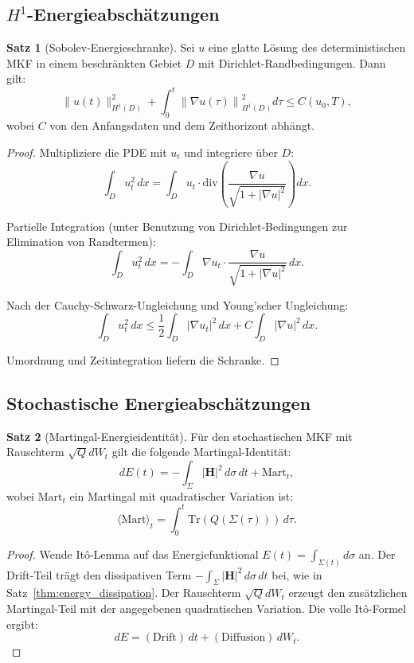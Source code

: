 \documentclass[a4paper,12pt]{article}
\theoremstyle{definition}
\newtheorem{satz}{Satz}
\begin{document}
\subsection{$H^1$-Energieabschätzungen}

\begin{satz}[Sobolev-Energieschranke]
	\label{thm:h1_bound}
	Sei $u$ eine glatte Lösung des deterministischen MKF in einem beschränkten Gebiet $D$ mit Dirichlet-Randbedingungen. Dann gilt:
	\[
	\|u(t)\|_{H^1(D)}^2 + \int_0^t \left\|\nabla u(\tau)\right\|_{H^1(D)}^2 d\tau \leq C(u_0, T),
	\]
	wobei $C$ von den Anfangsdaten und dem Zeithorizont abhängt.
\end{satz}

\begin{proof}
	Multipliziere die PDE mit $u_t$ und integriere über $D$:
	\[
	\int_D u_t^2 \, dx = \int_D u_t \cdot \text{div}\left(\frac{\nabla u}{\sqrt{1+|\nabla u|^2}}\right) dx.
	\]
	
	Partielle Integration (unter Benutzung von Dirichlet-Bedingungen zur Elimination von Randtermen):
	\[
	\int_D u_t^2 \, dx = -\int_D \nabla u_t \cdot \frac{\nabla u}{\sqrt{1+|\nabla u|^2}} \, dx.
	\]
	
	Nach der Cauchy-Schwarz-Ungleichung und Young'scher Ungleichung:
	\[
	\int_D u_t^2 \, dx \leq \frac{1}{2}\int_D |\nabla u_t|^2 \, dx + C \int_D |\nabla u|^2 \, dx.
	\]
	
	Umordnung und Zeitintegration liefern die Schranke.
\end{proof}

\subsection{Stochastische Energieabschätzungen}

\begin{satz}[Martingal-Energieidentität]
	\label{thm:martingale_energy}
	Für den stochastischen MKF mit Rauschterm $\sqrt{Q} dW_t$ gilt die folgende Martingal-Identität:
	\[
	d E(t) = -\int_\Sigma |\mathbf{H}|^2 \, d\sigma \, dt + \text{Mart}_t,
	\]
	wobei $\text{Mart}_t$ ein Martingal mit quadratischer Variation ist:
	\[
	\langle \text{Mart} \rangle_t = \int_0^t \text{Tr}(Q(\Sigma(\tau))) \, d\tau.
	\]
\end{satz}

\begin{proof}
	Wende Itô-Lemma auf das Energiefunktional $E(t) = \int_{\Sigma(t)} d\sigma$ an. Der Drift-Teil trägt den dissipativen Term $-\int_\Sigma |\mathbf{H}|^2 \, d\sigma \, dt$ bei, wie in Satz~\ref{thm:energy_dissipation}. Der Rauschterm $\sqrt{Q} dW_t$ erzeugt den zusätzlichen Martingal-Teil mit der angegebenen quadratischen Variation. Die volle Itô-Formel ergibt:
	\[
	dE = (\text{Drift}) \, dt + (\text{Diffusion}) \, dW_t.
	\]
\end{proof}
\end{document}
